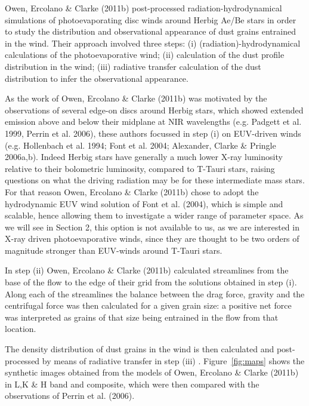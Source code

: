 \documentclass[10pt,fleqn,twoside]{article}
\begin{document}
Owen, Ercolano \& Clarke (2011b) post-processed
radiation-hydrodynamical simulations of photoevaporating disc winds
around Herbig Ae/Be stars in order to study the distribution and
observational appearance of dust grains entrained in the wind. Their
approach involved three steps: (i) (radiation)-hydrodynamical
calculations of the photoevaporative wind; (ii) calculation of the
dust profile distribution in the wind; (iii) radiative transfer
calculation of the dust distribution to infer the observational
appearance. 

As the work of Owen, Ercolano \& Clarke (2011b) was motivated by the
observations of several edge-on discs around Herbig stars, which
showed extended emission above and below their midplane at NIR
wavelengths (e.g. Padgett et al. 1999, Perrin et al. 2006), these
authors focussed in step (i)  on EUV-driven winds (e.g. Hollenbach et al. 1994;
Font et al. 2004; Alexander, Clarke \& Pringle 2006a,b). Indeed Herbig
stars have generally a much lower X-ray luminosity relative to their
bolometric luminosity, compared to T-Tauri stars, raising questions on
what the driving radiation may be for these intermediate mass stars. For
that reason Owen, Ercolano \& Clarke (2011b) chose to adopt the
hydrodynamic EUV wind solution of Font et al. (2004), which is simple and
scalable, hence allowing them to investigate a wider range of
parameter space. As we will see in Section 2, this option is not
available to us, as we are interested in X-ray driven
photoevaporative winds, since they are thought to be two orders of
magnitude stronger than EUV-winds around T-Tauri
stars. 

In step (ii) Owen, Ercolano \& Clarke (2011b) calculated streamlines
from the base of the flow to the edge of their grid from the solutions
obtained in step (i). Along each of the streamlines the balance
between the drag force, gravity and the centrifugal force was then
calculated for a given grain size: a positive net force was interpreted
as grains of that size being entrained in the flow from that
location. 

The density distribution of dust grains in the wind is
then calculated and post-processed by means of radiative
transfer in step (iii) . Figure~\ref{fig:maps} shows the synthetic images 
obtained from the models of Owen, Ercolano \& Clarke (2011b) in L,K \&
H band and composite, which were then compared 
with the observations of Perrin et al. (2006). 
\end{document}
